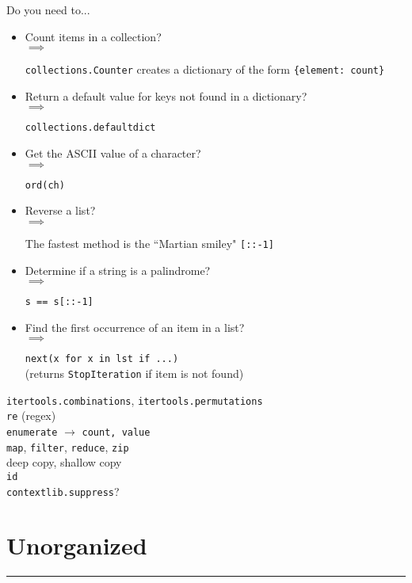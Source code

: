 \documentclass[12pt, titlepage]{article}
\newcommand{\imply}[1]{
  \-\hspace{1em}$\implies$ \parbox[t]{11.2cm}{#1}
}
\begin{document}
Do you need to...
\begin{itemize}
  \item Count items in a collection? \smallskip\\
    \imply{\texttt{collections.Counter} creates a dictionary of the form \texttt{\{element: count\}}}
  \item Return a default value for keys not found in a dictionary? \smallskip\\
    \imply{\texttt{collections.defaultdict}}
  \item Get the ASCII value of a character? \smallskip\\
    \imply{\texttt{ord(ch)}}
  \item Reverse a list? \smallskip\\
    \imply{The fastest method is the ``Martian smiley" \texttt{[::-1]}}
  \item Determine if a string is a palindrome? \smallskip\\
    \imply{\texttt{s == s[::-1]}}
  \item Find the first occurrence of an item in a list? \smallskip\\
      \imply{\texttt{next(x for x in lst if ...)} \\
      (returns \texttt{StopIteration} if item is not found)}
\end{itemize}

\texttt{itertools.combinations}, \texttt{itertools.permutations} \\
\texttt{re} (regex) \\
\texttt{enumerate} $\rightarrow$ \texttt{count, value} \\
\texttt{map}, \texttt{filter}, \texttt{reduce}, \texttt{zip} \\
deep copy, shallow copy \\
\texttt{id} \\
\texttt{contextlib.suppress}?

\section{Unorganized}
\hrule\vspace{5ex}
\end{document}
